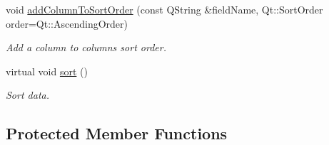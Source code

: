 \begin{DoxyCompactItemize}
void \hyperlink{classmdt_abstract_sql_widget_a3c03a6c43f4488b377aa72879c10e066}{add\-Column\-To\-Sort\-Order} (const Q\-String \&field\-Name, Qt\-::\-Sort\-Order order=Qt\-::\-Ascending\-Order)
\begin{DoxyCompactList}\small\item\em Add a column to columns sort order. \end{DoxyCompactList}\item 
virtual void \hyperlink{classmdt_abstract_sql_widget_a2c83a26fe75b708948c80a51887075e9}{sort} ()
\begin{DoxyCompactList}\small\item\em Sort data. \end{DoxyCompactList}\end{DoxyCompactItemize}
\subsection*{Protected Member Functions}
